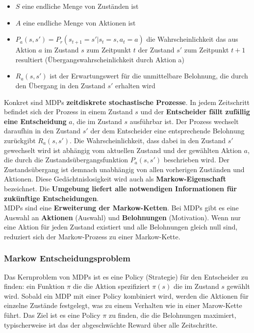 \documentclass[10pt]{scrartcl}
\begin{document}
\begin{itemize}
\item{$S$ eine endliche Menge von Zuständen ist}
\item{$A$ eine endliche Menge von Aktionen ist}
\item{$P_{a}(s,s') = P_{r}(s_{t+1} = s' | s_{t} = s, a_{t} = a)$ die Wahrscheinlichkeit das aus Aktion $a$ im Zustand $s$ zum Zeitpunkt $t$ der  Zustand $s'$ zum Zeitpunkt $t+1$ resultiert  (Übergangswahrscheinlichkeit durch Aktion a)}
\item{$R_{a}(s,s')$ ist der Erwartungswert für die unmittelbare Belohnung, die durch den Übergang in den Zustand $s'$ erhalten wird}
\end{itemize}

Konkret sind MDPs \textbf{zeitdiskrete stochastische Prozesse}. In jedem Zeitschritt befindet sich der Prozess in einem Zustand $s$ und der \textbf{Entscheider fällt zufällig eine Entscheidung} $a$, die im Zustand $s$ ausführbar ist. Der Prozess wechselt daraufhin in den Zustand $s'$ der dem Entscheider eine entsprechende Belohnung zurückgibt $R_{a}(s,s')$. Die Wahrscheinlichkeit, dass dabei in den Zustand $s'$ gewechselt wird ist abhängig vom aktuellen Zustand und der gewählten Aktion $a$, die durch die Zustandsübergangsfunktion $P_{a}(s,s')$ beschrieben wird. Der Zustandsübergang ist demnach unabhängig von allen vorherigen Zuständen und Aktionen. Diese Gedächtnislosigkeit wird auch als \textbf{Markow-Eigenschaft} bezeichnet. Die \textbf{Umgebung liefert alle notwendigen Informationen für zukünftige Entscheidungen}.\\
MDPs sind eine \textbf{Erweiterung der Markow-Ketten}. Bei MDPs gibt es eine Auswahl an \textbf{Aktionen} (Auswahl) und \textbf{Belohnungen} (Motivation). Wenn nur eine Aktion für jeden Zustand existiert und alle Belohnungen gleich null sind, reduziert sich der Markow-Prozess zu einer Markow-Kette.

\subsubsection{Markow Entscheidungsproblem}
Das Kernproblem von MDPs ist es eine Policy (Strategie) für den Entscheider zu finden: ein Funktion $\pi$ die die Aktion spezifiziert $\pi(s)$ die im Zustand $s$ gewählt wird. Sobald ein MDP mit einer Policy kombiniert wird, werden die Aktionen für einzelne Zustände festgelegt, was zu einem Verhalten wie in einer Marow-Kette führt. Das Ziel ist es eine Policy $\pi$ zu finden, die die Belohnungen maximiert, typischerweise ist das der abgeschwächte Reward über alle Zeitschritte.
\end{document}
